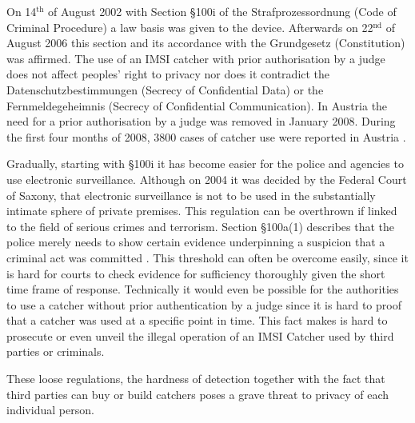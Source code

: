 On 14$^\text{th}$ of August 2002 with Section §100i of the Strafprozessordnung (Code of Criminal Procedure) a law basis was given to the device.
Afterwards on 22$^\text{nd}$ of August 2006 this section and its accordance with the Grundgesetz (Constitution) was affirmed.
The use of an IMSI catcher with prior authorisation by a judge does not affect peoples' right to privacy nor does it contradict the Datenschutzbestimmungen (Secrecy of Confidential Data) or the Fernmeldegeheimnis (Secrecy of Confidential Communication).
In Austria the need for a prior authorisation by a judge was removed in January 2008.
During the first four months of 2008, 3800 cases of catcher use were reported in Austria \cite{imsi_wiki}.

Gradually, starting with §100i it has become easier for the police and agencies to use electronic surveillance.
Although on 2004 it was decided by the Federal Court of Saxony, that electronic surveillance is not to be used in the substantially intimate sphere of private premises.
This regulation can be overthrown if linked to the field of serious crimes and terrorism.
Section §100a(1) describes that the police merely needs to show certain evidence underpinning a suspicion that a criminal act was committed \cite{criminal_justice}.
This threshold can often be overcome easily, since it is hard for courts to check evidence for sufficiency thoroughly given the short time frame of response.
Technically it would even be possible for the authorities to use a catcher without prior authentication by a judge since it is hard to proof that a catcher was used at a specific point in time.
This fact makes is hard to prosecute or even unveil the illegal operation of an IMSI Catcher used by third parties or criminals.

These loose regulations, the hardness of detection together with the fact that third parties  can buy or build catchers poses a grave threat to privacy of each individual person.
